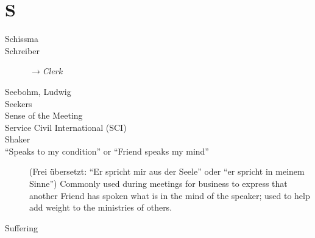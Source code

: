 \section*{S}

\articlesize

\begin{description}
 \item[Schissma]

 \item[Schreiber] $\to$\textit{Clerk}

 \item[Seebohm, Ludwig] 

 \item[Seekers]

 \item[Sense of the Meeting]

 \item[Service Civil International (SCI)]

 \item[Shaker]

 \item["`Speaks to my condition"' or "`Friend speaks my mind"'] (Frei übersetzt: "`Er spricht mir aus der Seele"' oder "`er spricht in meinem Sinne"')
    Commonly used during meetings for business to express that another Friend has spoken what is in the mind of the speaker; used to help add weight to the ministries of others.

 \item[Suffering]

 \end{description}

\normalsize
